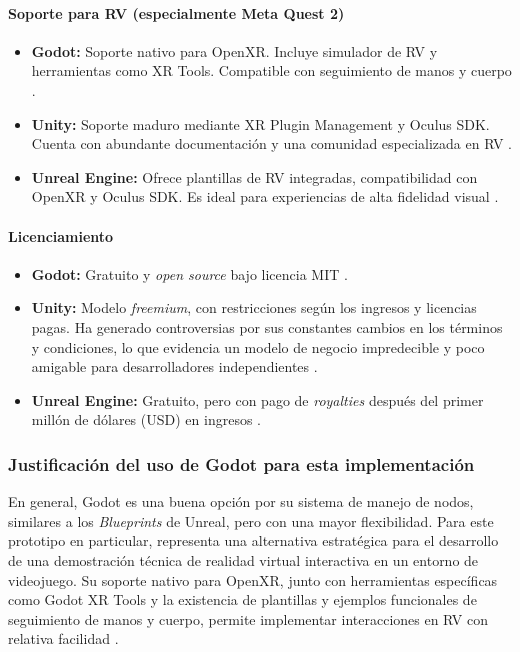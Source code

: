 \documentclass[journal,article,accept,pdftex,moreauthors]{Definitions/mdpi}
\begin{document}
\paragraph{Soporte para RV (especialmente Meta Quest 2)}
\begin{itemize}
    \item \textbf{Godot:} Soporte nativo para OpenXR. Incluye simulador de RV y herramientas como XR Tools. Compatible con seguimiento de manos y cuerpo \cite{godotXRTools2023}.
    
    \item \textbf{Unity:} Soporte maduro mediante XR Plugin Management y Oculus SDK. Cuenta con abundante documentación y una comunidad especializada en RV \cite{unityDocs2024}.
    
    \item \textbf{Unreal Engine:} Ofrece plantillas de RV integradas, compatibilidad con OpenXR y Oculus SDK. Es ideal para experiencias de alta fidelidad visual \cite{unrealDocs2024}.
\end{itemize}

\paragraph{Licenciamiento}
\begin{itemize}
    \item \textbf{Godot:} Gratuito y \textit{open source} bajo licencia MIT \cite{godotDocs2024}.
    
    \item \textbf{Unity:} Modelo \textit{freemium}, con restricciones según los ingresos y licencias pagas. Ha generado controversias por sus constantes cambios en los términos y condiciones, lo que evidencia un modelo de negocio impredecible y poco amigable para desarrolladores independientes \cite{theVerge}.
    
    \item \textbf{Unreal Engine:} Gratuito, pero con pago de \textit{royalties} después del primer millón de dólares (USD) en ingresos \cite{unrealDocs2024}.
\end{itemize}

\subsubsection{Justificación del uso de Godot para esta implementación}
En general, Godot es una buena opción por su sistema de manejo de nodos, similares a los \textit{Blueprints} de Unreal, pero con una mayor flexibilidad. Para este prototipo en particular, representa una alternativa estratégica para el desarrollo de una demostración técnica de realidad virtual interactiva en un entorno de videojuego. Su soporte nativo para OpenXR, junto con herramientas específicas como Godot XR Tools y la existencia de plantillas y ejemplos funcionales de seguimiento de manos y cuerpo, permite implementar interacciones en RV con relativa facilidad \cite{godotXRTools2023}.
\end{document}
